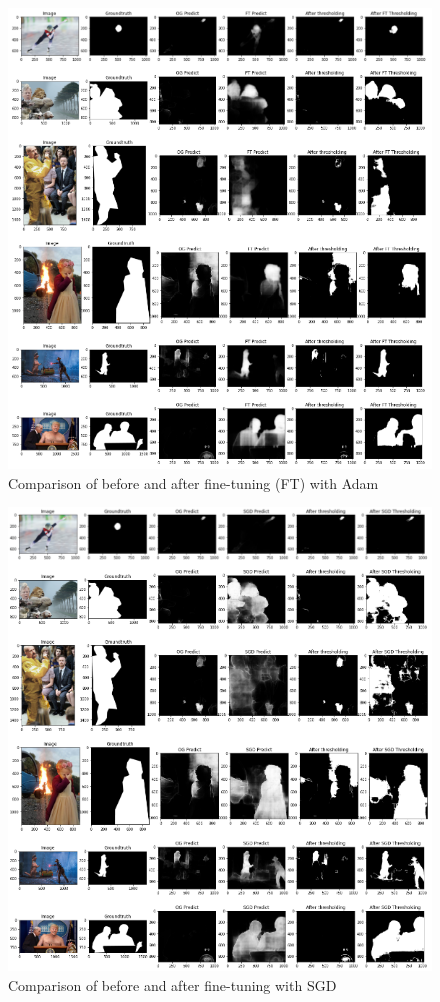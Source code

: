 \begin{figure}
    \centering
    \includegraphics[width=0.9\linewidth]{ViTAdam.png}
    \caption{Comparison of before and after fine-tuning (FT) with Adam}
    \label{fig:ViTAdam}
\end{figure}

\begin{figure}
    \centering
    \includegraphics[width=1\linewidth]{ViTSGD.png}
    \caption{Comparison of before and after fine-tuning with SGD}
    \label{fig:ViTSGD}
\end{figure}

